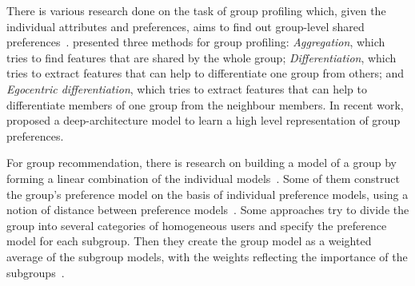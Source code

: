 There is various research done on the task of group profiling which, given the individual attributes and preferences, aims to find out group-level shared preferences~\cite{Senot:2011,Masthoff:2011}.
\citet{Tang:2011} presented three methods for group profiling: \emph{Aggregation}, which tries to find features that are shared by the whole group; \emph{Differentiation}, which tries to extract features that can help to differentiate one group from others; and \emph{Egocentric differentiation}, which tries to extract features that can help to differentiate members of one group from the neighbour members. In recent work, \citet{Hu:2014} proposed a deep-architecture model to learn a high level representation of group preferences.

For group recommendation,  there is research on building a model of a group by forming a linear combination of the individual models~\citep{Jameson:2007}. Some of them construct the group's preference model on the basis of individual preference models, using a notion of distance between preference models~\citep{Yu:2006}. Some approaches try to divide the group into several categories of homogeneous users and specify the preference model for each subgroup. Then they create the group model as a weighted average of the subgroup models, with the weights reflecting the importance of the subgroups~\citep{Ardissono:2003}.
